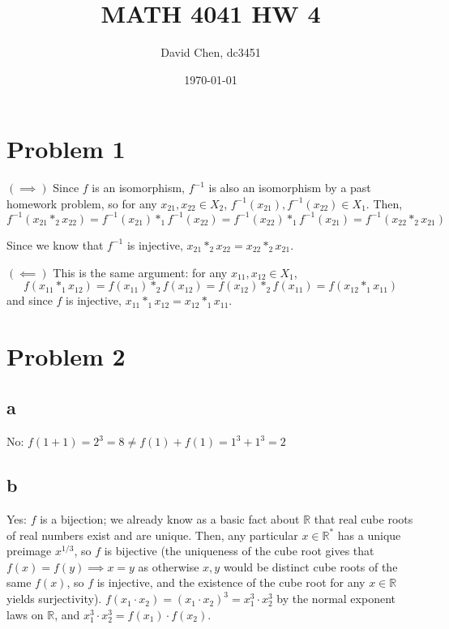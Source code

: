 \documentclass[12pt,letterpaper]{article}
\title{MATH 4041 HW 4}
\author{David Chen, dc3451}
\date{\today}
\theoremstyle{definition}
\newcommand{\R}{\mathbb{R}}
\begin{document}
\maketitle

\section*{Problem 1}


\((\implies)\) Since \(f\) is an isomorphism, \(f^{-1}\) is also an isomorphism by a past homework problem, so for any \(x_{21}, x_{22} \in X_{2}\), \(f^{-1}(x_{21}), f^{-1}(x_{22}) \in X_{1}\). Then,
\[
  f^{-1}(x_{21} *_{2} x_{22}) = f^{-1}(x_{21}) *_{1} f^{-1}(x_{22}) = f^{-1}(x_{22}) *_{1} f^{-1}(x_{21}) = f^{-1}(x_{22} *_{2} x_{21})
\]

Since we know that \(f^{-1}\) is injective, \(x_{21} *_{2} x_{22} = x_{22} *_{2} x_{21}\).

\((\impliedby)\) This is the same argument: for any \(x_{11}, x_{12} \in X_{1}\),
\[
  f(x_{11} *_{1} x_{12}) = f(x_{11}) *_{2} f(x_{12}) = f(x_{12}) *_{2} f(x_{11}) = f(x_{12} *_{1} x_{11})
\]
and since \(f\) is injective, \(x_{11} *_{1} x_{12} = x_{12} *_{1} x_{11}\).

\section*{Problem 2}

\subsection*{a}

No: \(f(1 + 1) = 2^{3} = 8 \neq f(1) + f(1) = 1^{3} + 1^{3} = 2\)

\subsection*{b}

Yes: \(f\) is a bijection; we already know as a basic fact about \(\R\) that real cube roots of real numbers exist and are unique. Then, any particular \(x \in \R^{*}\) has a unique preimage \(x^{1/3}\), so \(f\) is bijective (the uniqueness of the cube root gives that \(f(x) = f(y) \implies x = y\) as otherwise \(x,y\) would be distinct cube roots of the same \(f(x)\), so \(f\) is injective, and the existence of the cube root for any \(x \in \R\) yields surjectivity). \(f(x_{1}\cdot x_{2}) = (x_{1} \cdot x_{2})^{3} = x_{1}^{3}\cdot x_{2}^{3}\) by the normal exponent laws on \(\R\), and \(x_{1}^{3} \cdot x_{2}^{3} = f(x_{1}) \cdot f(x_{2})\).
\end{document}
